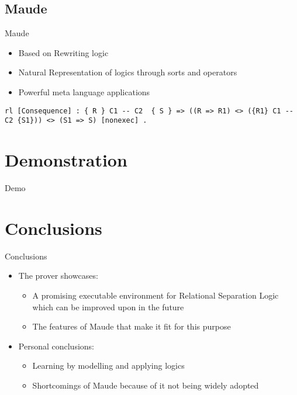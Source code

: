 \documentclass{beamer}
\begin{document}
\subsection{Maude}
\begin{frame}[fragile]{Maude}
\begin{itemize}
	\item Based on Rewriting logic
	\item {Natural Representation of logics through sorts and operators}
	\item Powerful meta language applications
\end{itemize}
\begin{example}
	\begin{lstlisting}
rl [Consequence] : { R } C1 -- C2  { S } => ((R => R1) <> ({R1} C1 -- C2 {S1})) <> (S1 => S) [nonexec] .
\end{lstlisting}
\end{example}
\end{frame}
\section{Demonstration}
\begin{frame}{Demo}
\end{frame}
\section*{Conclusions}

\begin{frame}{Conclusions}
  \begin{itemize}
  \item The prover showcases:
  	\begin{itemize}
 		  		\item A promising executable environment for Relational Separation Logic which can be improved upon in the future
  		\item The features of Maude that make it fit for this purpose
  	\end{itemize} 
  \item Personal conclusions:
  \begin{itemize}
  \item Learning by modelling and applying logics
  \item Shortcomings of Maude because of it not being widely adopted
  \end{itemize}
  \end{itemize}
 
\end{frame}
\end{document}
